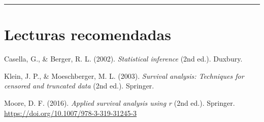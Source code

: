 \documentclass[
]{article}
\newlength{\cslhangindent}
\newenvironment{CSLReferences}[2] %
 {\begin{list}{}{%
  \setlength{\itemindent}{0pt}
  \setlength{\leftmargin}{0pt}
  \setlength{\parsep}{0pt}
  \ifodd #1
   \setlength{\leftmargin}{\cslhangindent}
   \setlength{\itemindent}{-1\cslhangindent}
  \fi
  \setlength{\itemsep}{#2\baselineskip}}}
 {\end{list}}
\begin{document}
\begin{center}\rule{0.5\linewidth}{0.5pt}\end{center}

\section*{Lecturas recomendadas}\label{lecturas-recomendadas}

\label{refs}
\begin{CSLReferences}{1}{0}
Casella, G., \& Berger, R. L. (2002). \emph{Statistical inference} (2nd
ed.). Duxbury.

Klein, J. P., \& Moeschberger, M. L. (2003). \emph{Survival analysis:
Techniques for censored and truncated data} (2nd ed.). Springer.

Moore, D. F. (2016). \emph{Applied survival analysis using r} (2nd ed.).
Springer. \url{https://doi.org/10.1007/978-3-319-31245-3}

\end{CSLReferences}
\end{document}
